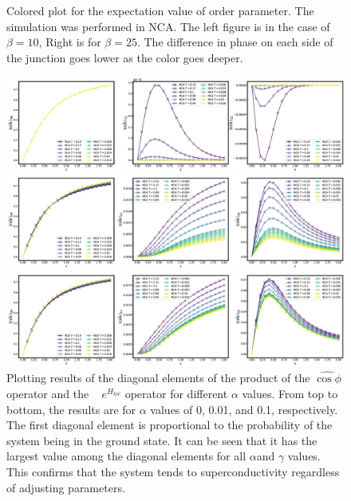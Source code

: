 \documentclass{article}[12pt]
\begin{document}
\begin{spacing}{1.5}
\begin{figure}[htbp]
  \caption{Colored plot for the expectation value of order parameter. The simulation was performed in NCA. The left figure is in the case of $\beta=10$, Right is for $\beta=25$.
  The difference in phase on each side of the junction goes lower as the color goes deeper.}
\end{figure}
\begin{figure}[htbp]
  \centerline{\includegraphics[width=17cm]{TexFigure/4/4_3_03_Matele_Ns3_alp0.png}}
  \centerline{\includegraphics[width=17cm]{TexFigure/4/4_3_04_Matele_Ns3_alp0_1.png}}
  \centerline{\includegraphics[width=17cm]{TexFigure/4/4_3_05_Matele_Ns3_alp1.png}}
  \caption{Plotting results of the diagonal elements of the product of the $\hat{\cos\phi}$ operator and the  
  $e^{H_{loc}}$ operator for different $\alpha$ values. From top to bottom, the results are for $\alpha$ 
  values of 0, 0.01, and 0.1, respectively. The first diagonal element is proportional to the probability of 
  the system being in the ground state. It can be seen that it has the largest value among the diagonal elements 
  for all $\alpha $and $\gamma$ values. This confirms that the system tends to superconductivity regardless of 
  adjusting parameters.}
  \end{figure}
\pagebreak

\end{spacing}
\end{document}
